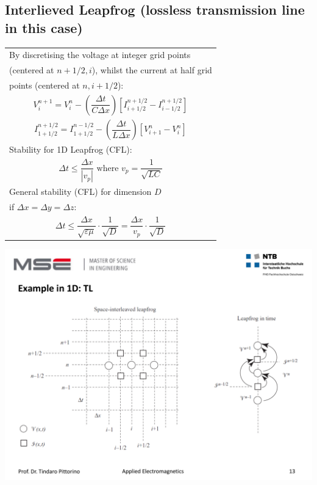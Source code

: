 \subsection{Interlieved Leapfrog (lossless transmission line in this case)}
\begin{minipage}[rt]{9cm}
	\begin{tabular}{l}
		By discretising the voltage at integer grid points\\ (centered at $n+1/2,i$), whilst the current at half grid \\points (centered at $n,i+1/2$): \\
		\begin{equation*}
			V_{i}^{n+1} = V_{i}^{n} - \left(\frac{\Delta t}{C \Delta x}\right) \left[I_{i+1/2}^{n+1/2} - I_{i-1/2}^{n+1/2}\right]
		\end{equation*} \\
		\begin{equation*}
			I_{1+1/2}^{n+1/2} = I_{1+1/2}^{n-1/2} - \left(\frac{\Delta t}{L \Delta x}\right) \left[V_{i+1}^{n} - V_{i}^{n}\right]
		\end{equation*} \\
		Stability for 1D Leapfrog (CFL): \\
		\begin{equation*}
			\Delta t \leq \frac{\Delta x}{|v_p|} \textrm{ where } v_p = \frac{1}{\sqrt{LC}}
		\end{equation*} \\
		General stability (CFL) for dimension $D$ \\if $\Delta x = \Delta y = \Delta z$: \\
		\begin{equation*}
			\Delta t \leq \frac{\Delta x}{\sqrt{\varepsilon \mu}} \cdot \frac{1}{\sqrt{D}} = \frac{\Delta x}{v_p} \cdot \frac{1}{\sqrt{D}}
		\end{equation*}
	\end{tabular}
\end{minipage}
\begin{minipage}[rt]{10cm}
	\includegraphics[width=.95\textwidth]{./images/leapfrog.pdf}
\end{minipage}

